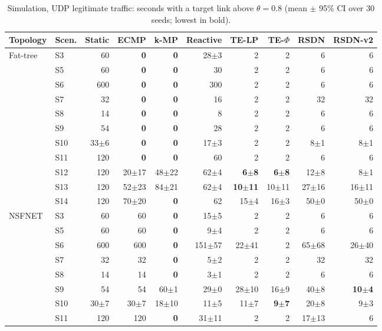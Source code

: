 \begin{table}[t]\centering\scriptsize
\caption{Simulation, UDP legitimate traffic: seconds with a target link above $\theta=0.8$ (mean $\pm$ 95\% CI over 30 seeds; lowest in bold).}\label{tab:sim_time}
\setlength{\tabcolsep}{3pt}
\begin{tabular}{llrrrrrrrr}
\toprule
Topology & Scen. & Static & ECMP & k-MP & Reactive & TE-LP & TE-$\Phi$ & RSDN & RSDN-v2\\
\midrule
Fat-tree & S3 & 60 & \textbf{0} & \textbf{0} & 28$\pm$3 & 2 & 2 & 6 & 6\\
 & S5 & 60 & \textbf{0} & \textbf{0} & 30 & 2 & 2 & 6 & 6\\
 & S6 & 600 & \textbf{0} & \textbf{0} & 300 & 2 & 2 & 6 & 6\\
 & S7 & 32 & \textbf{0} & \textbf{0} & 16 & 2 & 2 & 32 & 32\\
 & S8 & 14 & \textbf{0} & \textbf{0} & 8 & 2 & 2 & 6 & 6\\
 & S9 & 54 & \textbf{0} & \textbf{0} & 28 & 2 & 2 & 6 & 6\\
 & S10 & 33$\pm$6 & \textbf{0} & \textbf{0} & 17$\pm$3 & 2 & 2 & 8$\pm$1 & 8$\pm$1\\
 & S11 & 120 & \textbf{0} & \textbf{0} & 60 & 2 & 2 & 6 & 6\\
 & S12 & 120 & 20$\pm$17 & 48$\pm$22 & 62$\pm$4 & \textbf{6$\pm$8} & \textbf{6$\pm$8} & 12$\pm$8 & 8$\pm$1\\
 & S13 & 120 & 52$\pm$23 & 84$\pm$21 & 62$\pm$4 & \textbf{10$\pm$11} & 10$\pm$11 & 27$\pm$16 & 16$\pm$11\\
 & S14 & 120 & 70$\pm$20 & \textbf{0} & 62 & 15$\pm$4 & 16$\pm$3 & 50$\pm$0 & 50$\pm$0\\
\midrule
NSFNET & S3 & 60 & 60 & \textbf{0} & 15$\pm$5 & 2 & 2 & 6 & 6\\
 & S5 & 60 & 60 & \textbf{0} & 9$\pm$4 & 2 & 2 & 6 & 6\\
 & S6 & 600 & 600 & \textbf{0} & 151$\pm$57 & 22$\pm$41 & 2 & 65$\pm$68 & 26$\pm$40\\
 & S7 & 32 & 32 & \textbf{0} & 5$\pm$2 & 2 & 2 & 32 & 32\\
 & S8 & 14 & 14 & \textbf{0} & 3$\pm$1 & 2 & 2 & 6 & 6\\
 & S9 & 54 & 54 & 60$\pm$1 & 29$\pm$0 & 28$\pm$10 & 16$\pm$9 & 40$\pm$8 & \textbf{10$\pm$4}\\
 & S10 & 30$\pm$7 & 30$\pm$7 & 18$\pm$10 & 11$\pm$5 & 11$\pm$7 & \textbf{9$\pm$7} & 20$\pm$8 & 9$\pm$3\\
 & S11 & 120 & 120 & \textbf{0} & 31$\pm$11 & 2 & 2 & 17$\pm$13 & 6\\

\end{tabular}
\end{table}
